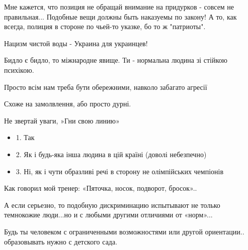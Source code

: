 \begin{itemize}
Мне кажется, что позиция не обращай внимание на придурков - совсем не
правильная... Подобные вещи должны быть наказуемы по закону! А то, как всегда,
полиция в стороне по чьей-то указке, бо то ж "патриоты".

Нацизм чистой воды - Украина для украинцев!


Бидло є бидло, то міжнародне явище. Ти - нормальна людина зі стійкою психікою.

Просто всім нам треба бути обережними, навколо забагато агресії


Схоже на замолвлення, або просто дурні.

Не звертай уваги, »Гни свою линию»💪

 

\begin{itemize}
  \item 1. Так
  \item 2. Як і будь-яка інша людина в цій країні (доволі небезпечно)
  \item 3. Ні, як і чути образливі речі в сторону не олімпійських чемпіонів
\end{itemize}

 

Как говорил мой тренер: «Пяточка, носок, подворот, бросок»..

А если серьезно, то подобную дискриминацию испытывают не только темнокожие
люди...но и с любыми другими отличиями от «норм»...

Будь ты человеком с ограниченными возможностями или другой ориентации..
образовывать нужно с детского сада.


 


\end{itemize}
